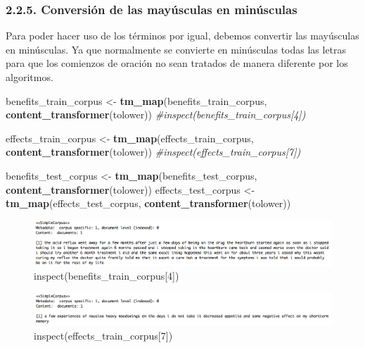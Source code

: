 \documentclass[spanish,]{article}
\newenvironment{Shaded}{\begin{snugshade}}{\end{snugshade}}
\newcommand{\KeywordTok}[1]{\textcolor[rgb]{0.13,0.29,0.53}{\textbf{#1}}}
\newcommand{\StringTok}[1]{\textcolor[rgb]{0.31,0.60,0.02}{#1}}
\newcommand{\CommentTok}[1]{\textcolor[rgb]{0.56,0.35,0.01}{\textit{#1}}}
\newcommand{\NormalTok}[1]{#1}
\begin{document}
\subsubsection{2.2.5. Conversión de las mayúsculas en
minúsculas}\label{conversion-de-las-mayusculas-en-minusculas}

Para poder hacer uso de los términos por igual, debemos convertir las
mayúsculas en minúsculas. Ya que normalmente se convierte en minúsculas
todas las letras para que los comienzos de oración no sean tratados de
manera diferente por los algoritmos.

\begin{Shaded}
\begin{Highlighting}[]
\NormalTok{benefits_train_corpus <-}\StringTok{ }\KeywordTok{tm_map}\NormalTok{(benefits_train_corpus, }\KeywordTok{content_transformer}\NormalTok{(tolower))}
\CommentTok{#inspect(benefits_train_corpus[4])}

\NormalTok{effects_train_corpus <-}\StringTok{ }\KeywordTok{tm_map}\NormalTok{(effects_train_corpus, }\KeywordTok{content_transformer}\NormalTok{(tolower))}
\CommentTok{#inspect(effects_train_corpus[7])}

\NormalTok{benefits_test_corpus <-}\StringTok{ }\KeywordTok{tm_map}\NormalTok{(benefits_test_corpus, }\KeywordTok{content_transformer}\NormalTok{(tolower))}
\NormalTok{effects_test_corpus <-}\StringTok{ }\KeywordTok{tm_map}\NormalTok{(effects_test_corpus, }\KeywordTok{content_transformer}\NormalTok{(tolower))}
\end{Highlighting}
\end{Shaded}

\begin{figure}[h]
    \centering
    \includegraphics[width=1\textwidth]{imagenes/benefits_mayusculas.png}
    \caption{inspect(benefits\_train\_corpus[4])}
    \label{benefits2}
\end{figure}

\begin{figure}[h]
    \centering
    \includegraphics[width=1\textwidth]{imagenes/effects_mayusculas.png}
    \caption{inspect(effects\_train\_corpus[7])}
    \label{benefits2}
\end{figure}
\end{document}
